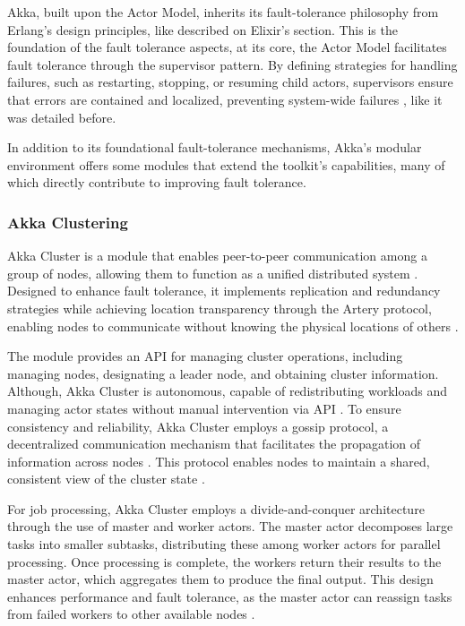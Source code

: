 Akka, built upon the Actor Model, inherits its fault-tolerance philosophy from Erlang’s design principles, like described on Elixir's section. This is the foundation of the fault tolerance aspects, at its core, the Actor Model facilitates fault tolerance through the supervisor pattern. By defining strategies for handling failures, such as restarting, stopping, or resuming child actors, supervisors ensure that errors are contained and localized, preventing system-wide failures \cite{akka-docs,Abraham2023,Juric2024}, like it was detailed before.

In addition to its foundational fault-tolerance mechanisms, Akka’s modular environment offers some modules that extend the toolkit’s capabilities, many of which directly contribute to improving fault tolerance.

\subsubsection{Akka Clustering}

Akka Cluster is a module that enables peer-to-peer communication among a group of nodes, allowing them to function as a unified distributed system \cite{Moradi2023,akka-docs}. Designed to enhance fault tolerance, it implements replication and redundancy strategies while achieving location transparency through the Artery protocol, enabling nodes to communicate without knowing the physical locations of others \cite{Abraham2023}.

The module provides an API for managing cluster operations, including managing nodes, designating a leader node, and obtaining cluster information. Although, Akka Cluster is autonomous, capable of redistributing workloads and managing actor states without manual intervention via API \cite{Abraham2023}. To ensure consistency and reliability, Akka Cluster employs a gossip protocol, a decentralized communication mechanism that facilitates the propagation of information across nodes \cite{Tanenbaum2023,akka-docs}. This protocol enables nodes to maintain a shared, consistent view of the cluster state \cite{Tanenbaum2023}.

For job processing, Akka Cluster employs a divide-and-conquer architecture through the use of master and worker actors. The master actor decomposes large tasks into smaller subtasks, distributing these among worker actors for parallel processing. Once processing is complete, the workers return their results to the master actor, which aggregates them to produce the final output. This design enhances performance and fault tolerance, as the master actor can reassign tasks from failed workers to other available nodes \cite{akka-docs}.


